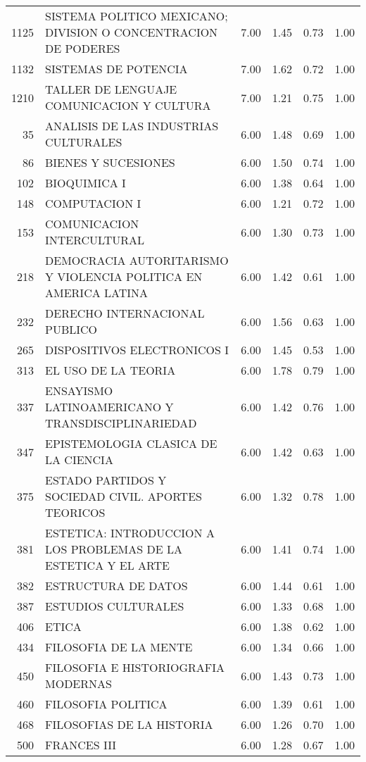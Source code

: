 \documentclass[12pt]{article}
\begin{document}
\begin{table}[ht]
\begin{tabular}{rlrrrr}
  1125 & SISTEMA POLITICO MEXICANO; DIVISION O CONCENTRACION DE PODERES & 7.00 & 1.45 & 0.73 & 1.00 \\ 
  1132 & SISTEMAS DE POTENCIA & 7.00 & 1.62 & 0.72 & 1.00 \\ 
  1210 & TALLER DE LENGUAJE COMUNICACION Y CULTURA & 7.00 & 1.21 & 0.75 & 1.00 \\ 
  35 & ANALISIS DE LAS INDUSTRIAS CULTURALES & 6.00 & 1.48 & 0.69 & 1.00 \\ 
  86 & BIENES Y SUCESIONES & 6.00 & 1.50 & 0.74 & 1.00 \\ 
  102 & BIOQUIMICA I & 6.00 & 1.38 & 0.64 & 1.00 \\ 
  148 & COMPUTACION I & 6.00 & 1.21 & 0.72 & 1.00 \\ 
  153 & COMUNICACION INTERCULTURAL & 6.00 & 1.30 & 0.73 & 1.00 \\ 
  218 & DEMOCRACIA AUTORITARISMO Y VIOLENCIA POLITICA EN AMERICA LATINA & 6.00 & 1.42 & 0.61 & 1.00 \\ 
  232 & DERECHO INTERNACIONAL PUBLICO & 6.00 & 1.56 & 0.63 & 1.00 \\ 
  265 & DISPOSITIVOS ELECTRONICOS I & 6.00 & 1.45 & 0.53 & 1.00 \\ 
  313 & EL USO DE LA TEORIA & 6.00 & 1.78 & 0.79 & 1.00 \\ 
  337 & ENSAYISMO LATINOAMERICANO Y TRANSDISCIPLINARIEDAD & 6.00 & 1.42 & 0.76 & 1.00 \\ 
  347 & EPISTEMOLOGIA CLASICA DE LA CIENCIA & 6.00 & 1.42 & 0.63 & 1.00 \\ 
  375 & ESTADO PARTIDOS Y SOCIEDAD CIVIL. APORTES TEORICOS & 6.00 & 1.32 & 0.78 & 1.00 \\ 
  381 & ESTETICA: INTRODUCCION A LOS PROBLEMAS DE LA ESTETICA Y EL ARTE & 6.00 & 1.41 & 0.74 & 1.00 \\ 
  382 & ESTRUCTURA DE DATOS & 6.00 & 1.44 & 0.61 & 1.00 \\ 
  387 & ESTUDIOS CULTURALES & 6.00 & 1.33 & 0.68 & 1.00 \\ 
  406 & ETICA & 6.00 & 1.38 & 0.62 & 1.00 \\ 
  434 & FILOSOFIA DE LA MENTE & 6.00 & 1.34 & 0.66 & 1.00 \\ 
  450 & FILOSOFIA E HISTORIOGRAFIA MODERNAS & 6.00 & 1.43 & 0.73 & 1.00 \\ 
  460 & FILOSOFIA POLITICA & 6.00 & 1.39 & 0.61 & 1.00 \\ 
  468 & FILOSOFIAS DE LA HISTORIA & 6.00 & 1.26 & 0.70 & 1.00 \\ 
  500 & FRANCES III & 6.00 & 1.28 & 0.67 & 1.00 \\ 

\end{tabular}
\end{table}
\end{document}
